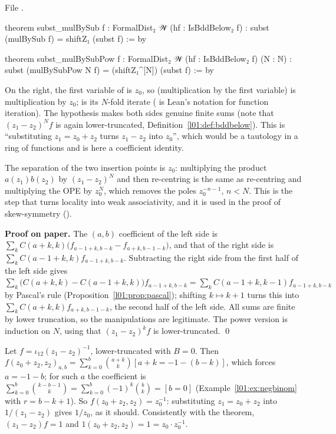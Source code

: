 \noindent File .
\begin{leancode}
theorem subst_mulBySub {f : FormalDist₂ 𝒲} (hf : IsBddBelow₂ f) :
    subst (mulBySub f) = shiftZ₁ (subst f) := by

theorem subst_mulBySubPow {f : FormalDist₂ 𝒲} (hf : IsBddBelow₂ f) (N : ℕ) :
    subst (mulBySubPow N f) = (shiftZ₁^[N]) (subst f) := by
\end{leancode}

\begin{dictionary}
On the right, the first variable of  is $z_0$, so  (multiplication by the first
variable) is multiplication by $z_0$;  is its $N$-fold iterate ( is Lean's notation for
function iteration). The hypothesis  makes both sides genuine finite sums (note that
$(z_1-z_2)^Nf$ is again lower-truncated, Definition~\ref{l01:def:bddbelow}). This is ``substituting $z_1 = z_0+z_2$ turns
$z_1-z_2$ into $z_0$'', which would be a tautology in a ring of functions and is here a coefficient identity.
\end{dictionary}

\begin{physics}
The separation of the two insertion points is $z_0$: multiplying the product $a(z_1)b(z_2)$ by $(z_1-z_2)^N$ and then
re-centring is the same as re-centring and multiplying the OPE by $z_0^N$, which removes the poles $z_0^{-n-1}$,
$n<N$. This is the step that turns locality into weak associativity, and it is used in the proof of skew-symmetry
().
\end{physics}

\textbf{Proof on paper.} The $(a,b)$ coefficient of the left side is
$\sum_kC(a+k,k)\big(f_{a-1+k,b-k}-f_{a+k,b-1-k}\big)$, and that of the right side is $\sum_kC(a-1+k,k)f_{a-1+k,b-k}$.
Subtracting the right side from the first half of the left side gives
$\sum_k\big(C(a+k,k)-C(a-1+k,k)\big)f_{a-1+k,b-k} = \sum_kC(a-1+k,k-1)f_{a-1+k,b-k}$ by Pascal's rule
(Proposition~\ref{l01:prop:pascal}); shifting $k\mapsto k+1$ turns this into $\sum_kC(a+k,k)f_{a+k,b-1-k}$, the second half of
the left side. All sums are finite by lower truncation, so the manipulations are legitimate. The power version is
induction on $N$, using that $(z_1-z_2)^kf$ is lower-truncated. \qed

\begin{example}\label{l01:ex:subst}
Let $f = \iota_{12}(z_1-z_2)^{-1}$, lower-truncated with $B = 0$. Then
$f(z_0+z_2,z_2)_{a,b} = \sum_{k=0}^{b}\binom{a+k}{k}[a+k = -1-(b-k)]$, which forces $a = -1-b$; for such $a$ the
coefficient is $\sum_{k=0}^b\binom{k-b-1}{k} = \sum_{k=0}^b(-1)^k\binom bk = [b = 0]$ (Example~\ref{l01:ex:negbinom} with
$r = b-k+1$). So $f(z_0+z_2,z_2) = z_0^{-1}$: substituting $z_1 = z_0+z_2$ into $1/(z_1-z_2)$ gives $1/z_0$, as it should.
Consistently with the theorem, $(z_1-z_2)f = 1$ and $1(z_0+z_2,z_2) = 1 = z_0\cdot z_0^{-1}$.
\end{example}

